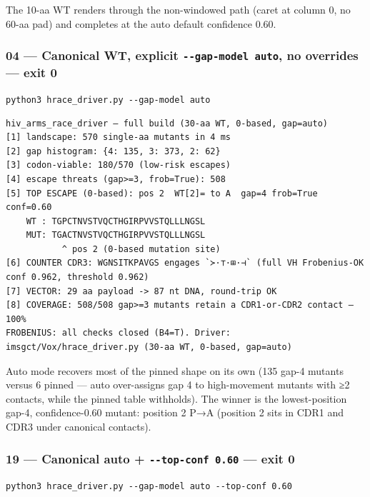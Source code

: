 The 10-aa WT renders through the non-windowed path (caret at column 0,
no 60-aa pad) and completes at the auto default confidence 0.60.

\hypertarget{canonical-wt-explicit---gap-model-auto-no-overrides-exit-0}{%
\subsubsection{\texorpdfstring{04 --- Canonical WT, explicit
\texttt{-\/-gap-model\ auto}, no overrides --- exit
0}{04 --- Canonical WT, explicit -\/-gap-model auto, no overrides --- exit 0}}\label{canonical-wt-explicit---gap-model-auto-no-overrides-exit-0}}

\texttt{python3\ hrace\_driver.py\ -\/-gap-model\ auto}

\begin{verbatim}
hiv_arms_race_driver — full build (30-aa WT, 0-based, gap=auto)
[1] landscape: 570 single-aa mutants in 4 ms
[2] gap histogram: {4: 135, 3: 373, 2: 62}
[3] codon-viable: 180/570 (low-risk escapes)
[4] escape threats (gap>=3, frob=True): 508
[5] TOP ESCAPE (0-based): pos 2  WT[2]= to A  gap=4 frob=True conf=0.60
    WT : TGPCTNVSTVQCTHGIRPVVSTQLLLNGSL
    MUT: TGACTNVSTVQCTHGIRPVVSTQLLLNGSL
           ^ pos 2 (0-based mutation site)
[6] COUNTER CDR3: WGNSITKPAVGS engages `≻·⊤·⊞·⊣` (full VH Frobenius-OK conf 0.962, threshold 0.962)
[7] VECTOR: 29 aa payload -> 87 nt DNA, round-trip OK
[8] COVERAGE: 508/508 gap>=3 mutants retain a CDR1-or-CDR2 contact — 100%
FROBENIUS: all checks closed (B4=T). Driver: imsgct/Vox/hrace_driver.py (30-aa WT, 0-based, gap=auto)
\end{verbatim}

Auto mode recovers most of the pinned shape on its own (135 gap-4
mutants versus 6 pinned --- auto over-assigns gap 4 to high-movement
mutants with ≥2 contacts, while the pinned table withholds). The winner
is the lowest-position gap-4, confidence-0.60 mutant: position 2 P→A
(position 2 sits in CDR1 and CDR3 under canonical contacts).

\hypertarget{canonical-auto---top-conf-0.60-exit-0}{%
\subsubsection{\texorpdfstring{19 --- Canonical auto +
\texttt{-\/-top-conf\ 0.60} --- exit
0}{19 --- Canonical auto + -\/-top-conf 0.60 --- exit 0}}\label{canonical-auto---top-conf-0.60-exit-0}}

\texttt{python3\ hrace\_driver.py\ -\/-gap-model\ auto\ -\/-top-conf\ 0.60}

